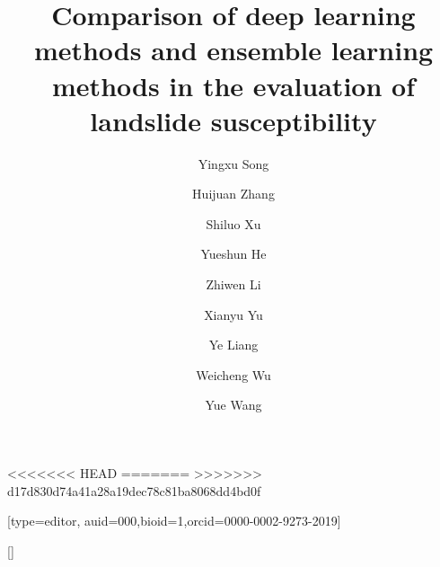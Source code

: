 \documentclass[a4paper,fleqn]{cas-sc}
\begin{document}
\let\WriteBookmarks\relax
\def\floatpagepagefraction{1}
\def\textpagefraction{.001}
<<<<<<< HEAD
=======
>>>>>>> d17d830d74a41a28a19dec78c81ba8068dd4bd0f

\title [mode = title]{Comparison of deep learning methods and ensemble learning methods in the evaluation of landslide susceptibility}

\author[1]{Yingxu Song} [type=editor,
auid=000,bioid=1,orcid=0000-0002-9273-2019]

\author[2]{Huijuan Zhang}[]

\author[4]{Shiluo Xu}

\author[5]{Yueshun He}

\author[6]{Zhiwen Li}

\author[7]{Xianyu Yu}

\author[8]{Ye Liang}

\author[1]{Weicheng Wu}

\author[2]{Yue Wang}

\address[1]{Jiangxi Engineering Laboratory on Radioactive Geoscience and Big Data Technology, School of Information and Engineering, East China University of Technology, Nanchang, 330013, Jiangxi, China; yxsong@ecut.edu.cn}
\address[2]{School of Earth Sciences, East China University of Technology, Nanchang, Jiangxi Province 330013, China}
\address[3]{Key Lab of Digital Land and Resources and Faculty of Earth Sciences, East China University of Technology, Nanchang, 330013, Jiangxi, China}
\address[4]{School of Information Engineering, Huzhou University, Huzhou 313000, China; xushiluo@163.com} 
\address[5]{East China University of Technology, Nanchang, 330013, Jiangxi, China; heys@ecut.edu.cn} 
\address[6]{School of Environmental and Chemical Engineering, Foshan University, Foshan, 528000, China; lizw1982@163.com} 
\address[7]{School of Civil Engineering, Architecture and Environment, Hubei University of Technology, Wuhan, Hubei Province 430074, China; yuxianyu@hbut.edu.cn} 
\address[8]{Jiangxi Engineering Technology Research Center of Nuclear Geoscience Data Science and System, East China University of Technology, Nanchang, 330013, Jiangxi, China; liangye@ecut.edu.cn} 
\address[1]{Key Lab of Digital Land and Resources and Faculty of Earth Sciences, East China University of Technology, Nanchang, 330013, Jiangxi, China; wuwch@ecut.edu.cn/wuwc030903@sina.com} 
\address[2]{School of Earth Sciences, East China University of Technology, Nanchang, Jiangxi Province 330013, China; 2020210058@ecut.edu.cn} 
\end{document}
